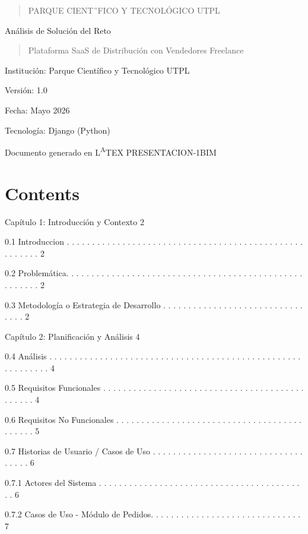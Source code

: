 \documentclass[
]{article}
\author{}
\date{}
\begin{document}
\begin{quote}
PARQUE CIENT˝FICO Y TECNOLÓGICO UTPL
\end{quote}

Análisis de Solución del Reto

\begin{quote}
Plataforma SaaS de Distribución con Vendedores Freelance
\end{quote}

Institución: Parque Científico y Tecnológico UTPL

Versión: 1.0

Fecha: Mayo 2026

Tecnología: Django (Python)

Documento generado en L\textsuperscript{A}TEX PRESENTACION-1BIM

\section{Contents}\label{contents}

Capítulo 1: Introducción y Contexto 2

0.1 Introduccion . . . . . . . . . . . . . . . . . . . . . . . . . . . .
. . . . . . . . . . . . . . . . . . . . . . . . . . 2

0.2 Problemática. . . . . . . . . . . . . . . . . . . . . . . . . . . .
. . . . . . . . . . . . . . . . . . . . . . . . . . 2

0.3 Metodología o Estrategia de Desarrollo . . . . . . . . . . . . . . .
. . . . . . . . . . . . . . . . . 2

Capítulo 2: Planificación y Análisis 4

0.4 Análisis . . . . . . . . . . . . . . . . . . . . . . . . . . . . . .
. . . . . . . . . . . . . . . . . . . . . . . . . . . . . 4

0.5 Requisitos Funcionales . . . . . . . . . . . . . . . . . . . . . . .
. . . . . . . . . . . . . . . . . . . . . . . 4

0.6 Requisitos No Funcionales . . . . . . . . . . . . . . . . . . . . .
. . . . . . . . . . . . . . . . . . . . . . 5

0.7 Historias de Usuario / Casos de Uso . . . . . . . . . . . . . . . .
. . . . . . . . . . . . . . . . . . . 6

0.7.1 Actores del Sistema . . . . . . . . . . . . . . . . . . . . . . .
. . . . . . . . . . . . . . . . . . . 6

0.7.2 Casos de Uso - Módulo de Pedidos. . . . . . . . . . . . . . . . .
. . . . . . . . . . . . . 7
\end{document}
